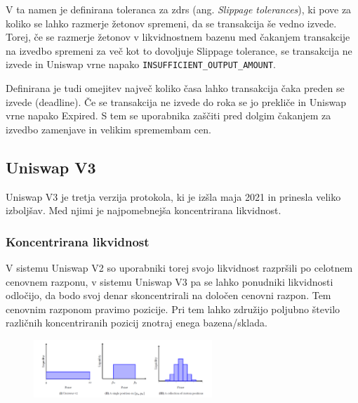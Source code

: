 \documentclass[a4paper,12pt]{article}%
\begin{document}
V ta namen je definirana toleranca za zdrs (ang. \textit{Slippage tolerances}), ki pove za koliko se lahko razmerje žetonov spremeni, da se transakcija še vedno izvede. Torej, če se razmerje žetonov v likvidnostnem bazenu med čakanjem transakcije na izvedbo spremeni za več kot to dovoljuje Slippage tolerance, se transakcija ne izvede in Uniswap vrne napako \texttt{INSUFFICIENT\_OUTPUT\_AMOUNT}. 

Definirana je tudi omejitev največ koliko časa lahko transakcija čaka preden se izvede (deadline). Če se transakcija ne izvede do roka se jo prekliče in Uniswap vrne napako Expired. S tem se uporabnika zaščiti pred dolgim čakanjem za izvedbo zamenjave in velikim spremembam cen.

\subsection{Uniswap V3}

Uniswap V3 je tretja verzija protokola, ki je izšla maja 2021 in prinesla veliko izboljšav. Med njimi je najpomebnejša koncentrirana likvidnost. 

\subsubsection{Koncentrirana likvidnost}

V sistemu Uniswap V2 so uporabniki torej svojo likvidnost razpršili po celotnem cenovnem razponu, v sistemu Uniswap V3 pa se lahko ponudniki likvidnosti odločijo, da bodo svoj denar skoncentrirali na določen cenovni razpon. Tem cenovnim razponom pravimo pozicije. 
Pri tem lahko združijo poljubno število različnih koncentriranih pozicij znotraj enega bazena/sklada.

\begin{figure}[!ht]
    \centering
    \includegraphics[width=0.6\textwidth]{pozicije.png}
\end{figure}
\end{document}
